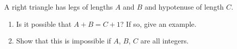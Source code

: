 A right triangle has legs of lengths $A$ and $B$ and hypotenuse of length $C$.
\begin{enumerate}
\item[(a)] Is it possible that $A+B=C+1$? If so, give an example.
\item[(b)] Show that this is impossible if $A$, $B$, $C$ are all integers.
\end{enumerate}
